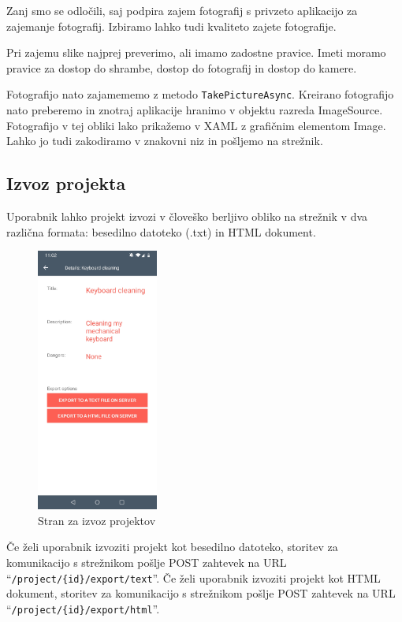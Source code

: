 \documentclass[a4paper, 12pt]{book}
\begin{document}
Zanj smo se odločili, saj podpira zajem fotografij s privzeto aplikacijo za zajemanje fotografij.
Izbiramo lahko tudi kvaliteto zajete fotografije.

Pri zajemu slike najprej preverimo, ali imamo zadostne pravice.
Imeti moramo pravice za dostop do shrambe, dostop do fotografij in dostop do kamere.

Fotografijo nato zajamememo z metodo \texttt{TakePictureAsync}.
Kreirano fotografijo nato preberemo in znotraj aplikacije hranimo v objektu razreda ImageSource.
Fotografijo v tej obliki lako prikažemo v XAML z grafičnim elementom Image.
Lahko jo tudi zakodiramo v znakovni niz in pošljemo na strežnik.


\subsection{Izvoz projekta}

Uporabnik lahko projekt izvozi v človeško berljivo obliko na strežnik v dva različna formata: besedilno datoteko (.txt) in HTML dokument.

\begin{figure}[H]
\begin{center}
	\includegraphics[width=4cm]{app_project_export}
\end{center}
	\caption{Stran za izvoz projektov}
\label{app_project_export}
\end{figure}

Če želi uporabnik izvoziti projekt kot besedilno datoteko, storitev za komunikacijo s strežnikom pošlje POST zahtevek na URL \enquote{\texttt{/project/\{id\}/export/text}}.
Če želi uporabnik izvoziti projekt kot HTML dokument, storitev za komunikacijo s strežnikom pošlje POST zahtevek na URL \enquote{\texttt{/project/\{id\}/export/html}}.
\end{document}
